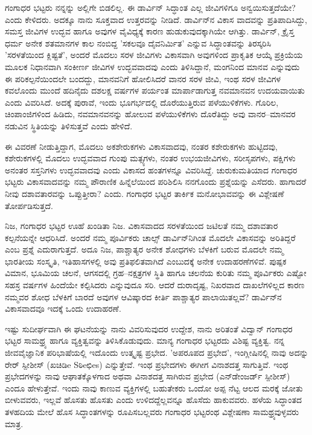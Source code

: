 ಗಂಗಾಧರ ಭಟ್ಟರು ನನ್ನನ್ನು ಅಲ್ಲಿಗೇ ಬಿಡಲಿಲ್ಲ.  ಈ ಡಾರ್ವಿನ್ ಸಿದ್ಧಾಂತ ಎಲ್ಲ ಜೀವಿಗಳಿಗೂ ಅನ್ವಯಿಸುತ್ತದೆಯೇ? ಎಂದು ಕೇಳಿದರು.  ಅದಕ್ಕೂ ನಾನು ಸೂಕ್ತವಾದ ಉತ್ತರವನ್ನು ನೀಡಿದೆ.  ಡಾರ್ವಿನ್‍ನ ವಿಕಾಸ ವಾದವನ್ನು ಪ್ರತಿಪಾದಿಸಿದ್ದು, ಸಮಸ್ತ ಜೀವಿಗಳ ಉದ್ಭವ ಹಾಗೂ ಅವುಗಳ ವೈವಿಧ್ಯಕ್ಕೆ ಕಾರಣ ಹುಡುಕುವುದಕ್ಕಾಗಿಯೇ ಆಗಿತ್ತು.  ಡಾರ್ವಿನ್, ಕ್ರೈಸ್ತ ಧರ್ಮ ಅನೇಕ ಶತಮಾನಗಳ ಕಾಲ ನಂಬಿದ್ದ 'ಸಕಲವೂ ದೈವನಿರ್ಮಿತ' ಎನ್ನುವ ಸಿದ್ಧಾಂತವನ್ನು ತಿರಸ್ಕರಿಸಿ 'ಸರಳತೆಯಿಂದ ಕ್ಲಿಷ್ಟತೆ', ಅಂದರೆ ಮೊದಲು ಸರಳ ಜೀವಿಗಳು ವಿಕಾಸವಾಗಿ ಅವುಗಳಿಂದ ಪ್ರಾಕೃತಿಕ ಆಯ್ಕೆ ಪ್ರಕ್ರಿಯೆಯ ಮೂಲಕ ನಿಧಾನವಾಗಿ ಸಂಕೀರ್ಣ ಜೀವಿಗಳ ಉದ್ಭವವಾದವು ಎಂದು ತಿಳಿಸಿದ್ದಾನೆ, ಮಂಗನಿಂದ ಮಾನವ ಎನ್ನುವುದು ಈ ಪರಿಕಲ್ಪನೆಯಿಂದಲೇ ಬಂದದ್ದು, ಮಾನವನಿಗೆ ಹೋಲಿಸಿದರೆ ವಾನರ ಸರಳ ಜೀವಿ, ಇಂಥ ಸರಳ ಜೀವಿಗಳ ಕವಲೊಂದು ಮುಂದೆ ಹದಿನೈದು ದಶಲಕ್ಷ ವರ್ಷಗಳ ಪರ್ಯಂತ ಮಾರ್ಪಾಡಾಗುತ್ತ ನವಮಾನವನ ಉದಯವಾಯಿತು ಎಂದು ವಿವರಿಸಿದೆ.  ಅದಕ್ಕೆ ಪುರಾವೆ, ಇಂದು ಭೂಗರ್ಭದಲ್ಲಿ ದೊರೆಯುತ್ತಿರುವ ಪಳೆಯುಳಿಕೆಗಳು.  ಗೊರಿಲ, ಚಿಂಪಾಂಜಿಗಳಿಂದ ಹಿಡಿದು, ನವಮಾನವನನ್ನು ಹೋಲುವ ಪಳೆಯುಳಿಕೆಗಳು ದೊರೆತಿದ್ದು ಅವು ವಾನರ–ಮಾನವರ ನಡುವಿನ ಸ್ಥಿತಿಯನ್ನು ತಿಳಿಸುತ್ತವೆ ಎಂದು ಹೇಳಿದೆ.  

ಈ ವಿವರಣೆ ನೀಡುತ್ತಿದ್ದಾಗ, ಮೊದಲು ಅಕಶೇರುಕಗಳು ವಿಕಾಸವಾದವು, ನಂತರ ಕಶೇರುಕಗಳು ಹುಟ್ಟಿದವು, ಕಶೇರುಕಗಳಲ್ಲಿ ಮೊದಲು ಉದ್ಭವವಾದ ಗುಂಪು ಮತ್ಸ್ಯಗಳು, ನಂತರ ಉಭಯಜೀವಿಗಳು, ಸರೀಸೃಪಗಳು, ಪಕ್ಷಿಗಳು ಅನಂತರ ಸಸ್ತನಿಗಳು ಉದ್ಭವವಾದವು ಎಂದು ವಿಕಾಸದ ಹಂತಗಳನ್ನೂ ವಿವರಿಸಿದ್ದೆ.  ಚುರುಕುಮತಿಯಾದ ಗಂಗಾಧರ ಭಟ್ಟರು ವಿಕಾಸವಾದವನ್ನು ನಮ್ಮ ಪೌರಾಣಿಕ ಹಿನ್ನೆಲೆಯಿಂದ ಪರಿಶಿಲಿಸಿ ನನಗೊಂದು ಪ್ರಶ್ನೆಯನ್ನು ಎಸೆದರು.  ಹಾಗಾದರೆ ನೀವು ದಶಾವತಾರವನ್ನು ಒಪ್ಪುತ್ತೀರಾ? ಎಂದು.  ಗಂಗಾಧರ ಭಟ್ಟರ ತಾರ್ಕಿಕ ಮನೋಭಾವವನ್ನು ಈ ವಿಶ್ಲೇಷಣೆ ತೋರ್ಪಡಿಸುತ್ತದೆ. 

ನಿಜ, ಗಂಗಾಧರ ಭಟ್ಟರ ಊಹೆ ಖಂಡಿತಾ ನಿಜ.  ವಿಕಾಸವಾದದ ಸರಳತೆಯಿಂದ ಜಟಿಲತೆ ನಮ್ಮ ದಶಾವತಾರ ಕಲ್ಪನೆಯನ್ನೇ ಆಧರಿಸಿದೆ.  ಅಂದರೆ ನಮ್ಮ ಪೂರ್ವಿಕರು ಚಾಲ್ಸ್ ಡಾರ್ವಿನ್‍ನಿಗಿಂತ ಮೊದಲೇ ವಿಕಾಸವನ್ನು ಅರಿತಿದ್ದರೆ ಎಂಬ ಪ್ರಶ್ನೆ ಎದುರಾಗುತ್ತದೆ.  ಅದೂ ನಿಜ, ಪಾಶ್ಚಾತ್ಯರ ಅನೇಕ ಶೋಧಗಳು ಬೆಳಕಿಗೆ ಬರುವ ಮೊದಲೇ ನಮ್ಮ ಭಾರತೀಯ ಸಂಸ್ಕೃತಿ, ಇತಿಹಾಸಗಳಲ್ಲಿ ಅವು ಪ್ರತಿಫಲಿತವಾಗಿದೆ ಎಂಬುದಕ್ಕೆ ಅನೇಕ ಉದಾಹರಣೆಗಳಿವೆ.  ಪುಷ್ಪಕ ವಿಮಾನ, ಭೂಮಿಯ ಚಲನೆ, ಆಗಸದಲ್ಲಿ ಗ್ರಹ–ನಕ್ಷತ್ರಗಳ ಸ್ಥಿತಿ ಹಾಗೂ ಚಲನೆಯ ಕುರಿತು ನಮ್ಮ ಪೂರ್ವಿಕರು ಎಷ್ಟೋ ಸಹಸ್ರ ವರ್ಷಗಳ ಹಿಂದೆಯೇ ಕಲ್ಪಿಸಿದರು ಎನ್ನುವುದೂ ಸರಿ.  ಆದರೆ ದುರಾದೃಷ್ಟ, ನಿಖರವಾದ ದಾಖಲೆಗಳಿಲ್ಲದ ಕಾರಣ ನಮ್ಮವರ ಶೋಧ ಬೆಳಕಿಗೆ ಬಾರದೆ ಅವುಗಳ ಆವಿಷ್ಕಾರದ ಕೀರ್ತಿ ಪಾಶ್ಚಾತ್ಯರ ಪಾಲಾಯಿತಲ್ಲವೆ?  ಡಾರ್ವಿನ್‍ನ ವಿಕಾಸವಾದವೂ ಇದಕ್ಕೆ ಒಂದು ಉದಾಹರಣೆ.   

ಇಷ್ಟು ಸುದೀರ್ಘವಾಗಿ ಈ ಘಟನೆಯನ್ನು ನಾನು ವಿವರಿಸುವುದರ ಉದ್ದೇಶ, ನಾನು ಅರಿತಂತೆ ವಿದ್ವಾನ್ ಗಂಗಾಧರ ಭಟ್ಟರ ಸಾಮಥ್ರ್ಯ ಹಾಗೂ ವ್ಯಕ್ತಿತ್ವವನ್ನು ತಿಳಿಸಿಕೊಡುವುದು.  ಮಾನ್ಯ ಗಂಗಾಧರ ಭಟ್ಟರದು ವಿಶಿಷ್ಟ ವ್ಯಕ್ತಿತ್ವ.  ನನ್ನ ಜೀವವೈಜ್ಞಾನಿಕ ಪರಿಭಾಷೆಯಲ್ಲಿ ಇದೊಂದು ಉತ್ಕೃಷ್ಟ ಪ್ರಭೇದ.  'ಅಪರೂಪದ ಪ್ರಭೇದ', ಇಂಗ್ಲೀಷಿನಲ್ಲಿ ನಾವು ಅದನ್ನು ರೇರ್ ಸ್ಪೀಶೀಸ್ (ಖಚಿಡಿe Sಠಿeಛಿes) ಎನ್ನುತ್ತೇವೆ.  ಇಂಥ ಪ್ರಭೇದಗಳು ಈಗೀಗ ವಿನಾಶದತ್ತ ಸಾಗುತ್ತಿವೆ.  ಇಂಥ ಪ್ರಭೇದಗಳನ್ನು ನಾವು ಆಘಾತಕ್ಕೊಳಗಾದ ಅಥವಾ ವಿನಾಶದತ್ತ ಸಾಗಿರುವ ಪ್ರಭೇದ (ಎನ್‍ಡೇಂಜರ್ಡ್ ಸ್ಪೀಶೀಸ್) ಎಂದೂ ಹೇಳುತ್ತೇವೆ.  ಇಂದು ನಾವು ಕಾಣುವ ವ್ಯಕ್ತಿಗಳಲ್ಲಿ ಬಹುತೇಕರು ಒಂದೋ ಅಪ್ಪ ನೆಟ್ಟ ಆಲದ ಮರಕ್ಕೆ ಜೋತು ಬೀಳುವವರು, ಇಲ್ಲವೆ ಹೊಸತು ಹೊಸತು ಎಂದು ಉಳಿದದ್ದೆಲ್ಲವನ್ನೂ ಹೊಸೆದು ಹಾಕುವವರು.  ಹಳೆಯ ಸಿದ್ಧಾಂತದ ತಳಹದಿಯ ಮೇಲೆ ಹೊಸ ಸಿದ್ಧಾಂತಗಳನ್ನು ರೂಪಿಸಬಲ್ಲವರು ಗಂಗಾಧರ ಭಟ್ಟರಂಥ ವಿಶ್ಲೇಷಣಾ ಸಾಮಥ್ರ್ಯವುಳ್ಳವರು ಮಾತ್ರ.              

